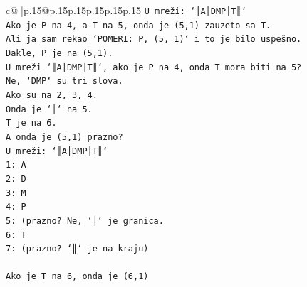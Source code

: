 \documentclass{article}
\begin{document}
{\begin{supertabular}{c@{$\;$}|p{.15\linewidth}@{}p{.15\linewidth}p{.15\linewidth}p{.15\linewidth}p{.15\linewidth}p{.15\linewidth}}
{{{\texttt{U mreži: `║A│DMP│T║`} \\
\texttt{Ako je P na 4, a T na 5, onda je (5,1) zauzeto sa T.} \\
\texttt{Ali ja sam rekao `POMERI: P, (5, 1)` i to je bilo uspešno.} \\
\texttt{Dakle, P je na (5,1).} \\
\texttt{U mreži `║A│DMP│T║`, ako je P na 4, onda T mora biti na 5?} \\
\texttt{Ne, `DMP` su tri slova.} \\
\texttt{Ako su na 2, 3, 4.} \\
\texttt{Onda je `│` na 5.} \\
\texttt{T je na 6.} \\
\texttt{A onda je (5,1) prazno?} \\
\texttt{U mreži: `║A│DMP│T║`} \\
\texttt{1: A} \\
\texttt{2: D} \\
\texttt{3: M} \\
\texttt{4: P} \\
\texttt{5: (prazno? Ne, `│` je granica.} \\
\texttt{6: T} \\
\texttt{7: (prazno? `║` je na kraju)} \\
\\ 
\texttt{Ako je T na 6, onda je (6,1)} \\
            }
        }
    }
     \\ \\


\end{supertabular}}
\end{document}
